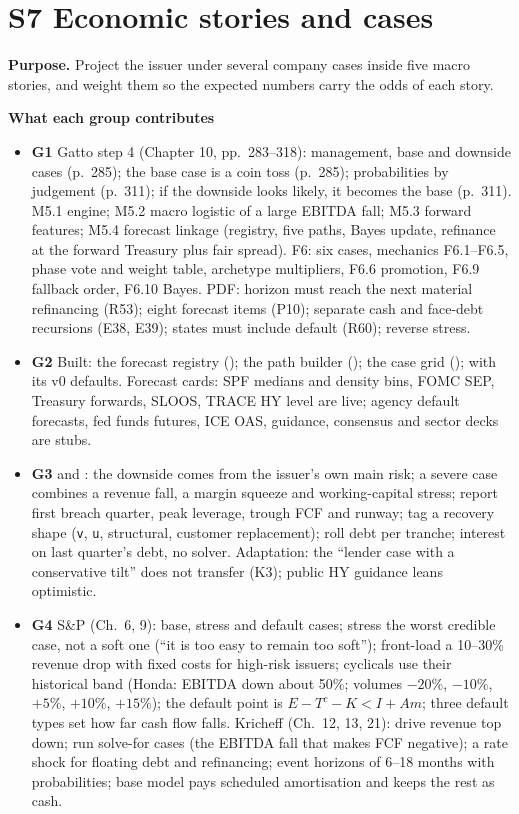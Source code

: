 \documentclass[11pt]{article}
\newcommand{\GA}{\textcolor{gA}{\textbf{G1}}}
\newcommand{\GB}{\textcolor{gB}{\textbf{G2}}}
\newcommand{\GC}{\textcolor{gC}{\textbf{G3}}}
\newcommand{\GD}{\textcolor{gD}{\textbf{G4}}}
\newcommand{\fld}[1]{\par\medskip\noindent\textbf{\textcolor{steel}{#1}}\par\nopagebreak}
\begin{document}
\section{S7 Economic stories and cases}\label{s7}

\textbf{Purpose.} Project the issuer under several company cases inside five macro stories, and weight them so the expected numbers carry the odds of each story.

\fld{What each group contributes}
\begin{itemize}
\item \GA{} Gatto step 4 (Chapter 10, pp.~283--318): management, base and downside cases (p.~285); the base case is a coin toss (p.~285); probabilities by judgement (p.~311); if the downside looks likely, it becomes the base (p.~311). M5.1 engine; M5.2 macro logistic of a large EBITDA fall; M5.3 forward features; M5.4 forecast linkage (registry, five paths, Bayes update, refinance at the forward Treasury plus fair spread). F6: six cases, mechanics F6.1--F6.5, phase vote and weight table, archetype multipliers, F6.6 promotion, F6.9 fallback order, F6.10 Bayes. PDF: horizon must reach the next material refinancing (R53); eight forecast items (P10); separate cash and face-debt recursions (E38, E39); states must include default (R60); reverse stress.
\item \GB{} Built: the forecast registry (); the path builder (); the case grid ();  with its v0 defaults. Forecast cards: SPF medians and density bins, FOMC SEP, Treasury forwards, SLOOS, TRACE HY level are live; agency default forecasts, fed funds futures, ICE OAS, guidance, consensus and sector decks are stubs.
\item \GC{}  and : the downside comes from the issuer's own main risk; a severe case combines a revenue fall, a margin squeeze and working-capital stress; report first breach quarter, peak leverage, trough FCF and runway; tag a recovery shape (\texttt{v}, \texttt{u}, structural, customer replacement); roll debt per tranche; interest on last quarter's debt, no solver. Adaptation: the ``lender case with a conservative tilt'' does not transfer (K3); public HY guidance leans optimistic.
\item \GD{} S\&P (Ch.~6, 9): base, stress and default cases; stress the worst credible case, not a soft one (``it is too easy to remain too soft''); front-load a 10--30\% revenue drop with fixed costs for high-risk issuers; cyclicals use their historical band (Honda: EBITDA down about 50\%; volumes $-20\%$, $-10\%$, $+5\%$, $+10\%$, $+15\%$); the default point is $E - T^c - K < I + Am$; three default types set how far cash flow falls. Kricheff (Ch.~12, 13, 21): drive revenue top down; run solve-for cases (the EBITDA fall that makes FCF negative); a rate shock for floating debt and refinancing; event horizons of 6--18 months with probabilities; base model pays scheduled amortisation and keeps the rest as cash.
\end{itemize}
\end{document}

